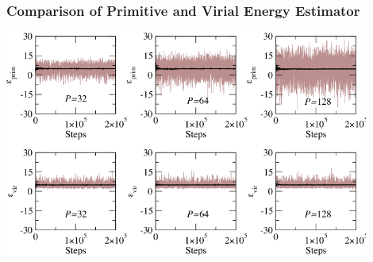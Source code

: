 \begin{frame}
  \frametitle{Comparison of Primitive and Virial Energy Estimator}
  \begin{center}
    \includegraphics[width=0.9\textwidth]{figs/energy_estimators_comp_color.pdf}
  \end{center}
\end{frame}

